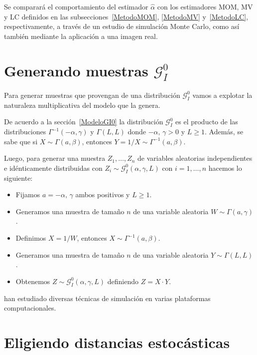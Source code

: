 Se comparará el comportamiento del estimador $\widehat{\alpha}$ con los estimadores MOM, MV y LC definidos en las subsecciones~\ref{MetodoMOM}, \ref{MetodoMV} y~\ref{MetodoLC}, respectivamente, a través de un estudio de simulación Monte Carlo, como así también mediante la aplicación a una imagen real.

\section{Generando muestras $\mathcal{G}_I^0$}

Para generar muestras que provengan de una distribución $\mathcal{G}_I^0$ vamos a explotar la naturaleza multiplicativa del modelo que la genera.

De acuerdo a la sección~\ref{ModeloGI0} la distribución  $\mathcal{G}_I^0$ es el producto de las distribuciones $\Gamma^{-1}(-\alpha,\gamma)$ y $\Gamma(L,L)$ donde $-\alpha, \, \gamma >0$ y $L\geq 1$. Además, se sabe que si $X \sim \Gamma(a,\beta)$, entonces $Y = 1/X \sim \Gamma^{-1}(a,\beta)$.

Luego, para generar una muestra $Z_1, \ldots, Z_n$ de variables aleatorias independientes e idénticamente distribuidas con $Z_i \sim \mathcal{G}_I^0(\alpha,\gamma,L)$ con $i=1, \ldots, n$ hacemos lo siguiente:
\begin{itemize}
	\item Fijamos $a=-\alpha, \, \gamma$ ambos positivos y $L \geq 1$.
	\item Generamos una muestra de tamaño $n$ de una variable aleatoria $W \sim \Gamma(a,\gamma)$.
	\item Definimos $X=1/W$, entonces $X \sim \Gamma^{-1}(a,\beta)$.
	\item Generamos una muestra de tamaño $n$ de una variable aleatoria $Y \sim \Gamma(L,L)$.
	\item Obtenemos $Z \sim \mathcal{G}_I^0(\alpha,\gamma,L)$ definiendo $Z=X \cdot Y$.
\end{itemize}
\citet{SamplingfromtheGI0Distribution2018} han estudiado diversas técnicas de simulación en varias plataformas computacionales.

\section{Eligiendo distancias estocásticas}
\label{EligiendoDistancias}


